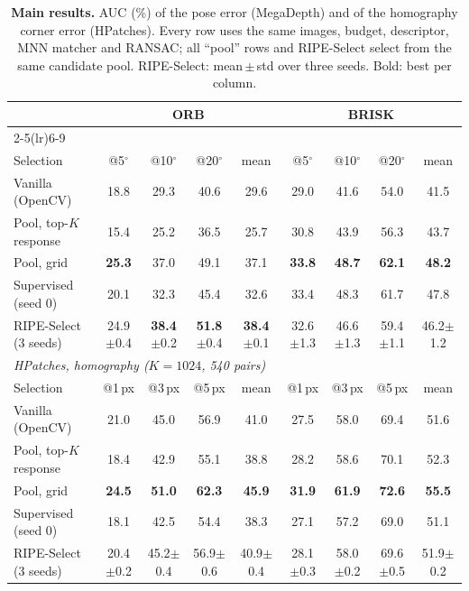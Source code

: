 \documentclass[10pt,twocolumn,letterpaper]{article}
\newcommand{\best}[1]{\textbf{#1}}
\newcommand{\std}[1]{{\scriptsize$\pm$#1}}
\begin{document}
\begin{table}[t]
  \centering\small
  \setlength\tabcolsep{5pt}
  \begin{tabular}{l cccc cccc}
    \toprule
    & \multicolumn{4}{c}{ORB} & \multicolumn{4}{c}{BRISK} \\
    \cmidrule(lr){2-5}\cmidrule(lr){6-9}
    \multicolumn{9}{l}{\textit{MegaDepth-1500, relative pose ($K=2048$, 500 pairs)}} \\
    Selection & @5$^\circ$ & @10$^\circ$ & @20$^\circ$ & mean & @5$^\circ$ & @10$^\circ$ & @20$^\circ$ & mean \\
    \midrule
    Vanilla (OpenCV)        & 18.8 & 29.3 & 40.6 & 29.6 & 29.0 & 41.6 & 54.0 & 41.5 \\
    Pool, top-$K$ response  & 15.4 & 25.2 & 36.5 & 25.7 & 30.8 & 43.9 & 56.3 & 43.7 \\
    Pool, grid              & \best{25.3} & 37.0 & 49.1 & 37.1 & \best{33.8} & \best{48.7} & \best{62.1} & \best{48.2} \\
    Supervised (seed 0)     & 20.1 & 32.3 & 45.4 & 32.6 & 33.4 & 48.3 & 61.7 & 47.8 \\
    RIPE-Select (3 seeds)   & 24.9\std{0.4} & \best{38.4}\std{0.2} & \best{51.8}\std{0.4} & \best{38.4}\std{0.1}
                            & 32.6\std{1.3} & 46.6\std{1.3} & 59.4\std{1.1} & 46.2\std{1.2} \\
    \midrule
    \multicolumn{9}{l}{\textit{HPatches, homography ($K=1024$, 540 pairs)}} \\
    Selection & @1\,px & @3\,px & @5\,px & mean & @1\,px & @3\,px & @5\,px & mean \\
    \midrule
    Vanilla (OpenCV)        & 21.0 & 45.0 & 56.9 & 41.0 & 27.5 & 58.0 & 69.4 & 51.6 \\
    Pool, top-$K$ response  & 18.4 & 42.9 & 55.1 & 38.8 & 28.2 & 58.6 & 70.1 & 52.3 \\
    Pool, grid              & \best{24.5} & \best{51.0} & \best{62.3} & \best{45.9} & \best{31.9} & \best{61.9} & \best{72.6} & \best{55.5} \\
    Supervised (seed 0)     & 18.1 & 42.5 & 54.4 & 38.3 & 27.1 & 57.2 & 69.0 & 51.1 \\
    RIPE-Select (3 seeds)   & 20.4\std{0.2} & 45.2\std{0.4} & 56.9\std{0.6} & 40.9\std{0.4}
                            & 28.1\std{0.3} & 58.0\std{0.2} & 69.6\std{0.5} & 51.9\std{0.2} \\
    \bottomrule
  \end{tabular}
  \caption{\textbf{Main results.} AUC (\%) of the pose error (MegaDepth) and of the homography corner
  error (HPatches). Every row uses the same images, budget, descriptor, MNN matcher and RANSAC; all
  ``pool'' rows and RIPE-Select select from the same candidate pool. RIPE-Select: mean\,$\pm$\,std over
  three seeds. Bold: best per column.}
  \label{tab:main}
\end{table}
\end{document}
